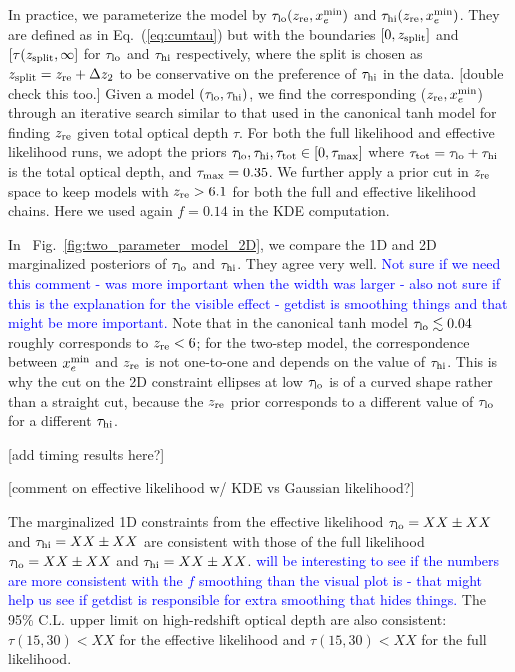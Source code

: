 \documentclass[prd,twocolumn,amsmath,amssymb,floatfix,superscriptaddress,nofootinbib]{revtex4-1}
\newcommand{\refeq}[1]{Eq.~(\ref{eq:#1})}
\newcommand{\reffig}[1]{Fig.~\ref{fig:#1}}
\newcommand{\zre}{z_{\rm re}}
\newcommand{\xemin}{x_e^{\rm min}}
\newcommand{\tauhi}{\tau_{\rm hi}}
\newcommand{\taulo}{\tau_{\rm lo}}
\newcommand{\wh}[1]{\textcolor{blue}{#1}}
\begin{document}
In practice, we parameterize the model by $\taulo(\zre, \xemin)$ and $\tauhi(\zre, \xemin)$.  They are defined as in \refeq{cumtau} but with the boundaries $[0, z_{\rm split}]$ and $[\tau(z_{\rm split}, \infty]$ for $\taulo$ and $\tauhi$ respectively, where the split is chosen as $z_{\rm split} = \zre + \Delta z_2$ to be conservative on the preference of $\tauhi$ in the data. [double check this too.]
Given a model $(\taulo, \tauhi)$, we find the corresponding ($\zre, \xemin$) through an iterative search similar to that used in the canonical tanh model for finding $\zre$ given total optical depth $\tau$. 
For both the full likelihood and effective likelihood runs, we adopt the priors $\taulo, \tauhi, \tau_{\rm tot} \in [0, \tau_{\rm max}]$ where  $\tau_{\rm tot} = \taulo + \tauhi$ is the total optical depth, and $\tau_{\rm max} = 0.35$. 
We further apply a prior cut in $\zre$ space to keep models with $\zre > 6.1$ for both the full and effective likelihood chains. Here we used again $f = 0.14$ in the KDE computation. 

In ~\reffig{two_parameter_model_2D}, we compare the 1D and 2D marginalized posteriors of $\taulo$ and $\tauhi$. They agree very well. 
\wh{Not sure if we need this comment - was more important when the width was larger - also not sure if this is the explanation for the visible effect - getdist is smoothing things and that might be more important.}
Note that in the canonical tanh model $\taulo \lesssim 0.04$ roughly corresponds to $\zre < 6$; for the two-step model, the correspondence between $\xemin$ and $\zre$ is not one-to-one and depends on the value of $\tauhi$. This is why the cut on the 2D constraint ellipses at low $\taulo$ is of a curved shape rather than a straight cut, because the $\zre$ prior corresponds to a different value of $\taulo$ for a different $\tauhi$. 

[add timing results here?] 

[comment on effective likelihood w/ KDE vs Gaussian likelihood?]

The marginalized 1D constraints from the effective likelihood $\taulo = XX \pm XX$ and $\tauhi = XX \pm XX$ are consistent with those of the full likelihood $\taulo = XX \pm XX$ and $\tauhi = XX \pm XX$. 
\wh{will be interesting to see if the numbers are more consistent with the $f$ smoothing than the visual plot is - that might help us see if getdist is responsible for extra smoothing that hides things.}
The 95\% C.L. upper limit on high-redshift optical depth are also consistent: $\tau(15, 30) < XX$ for the effective likelihood and $\tau(15, 30) < XX$ for the full likelihood.
\end{document}
